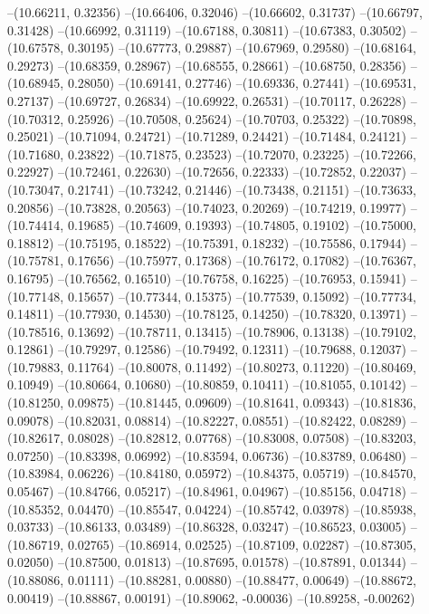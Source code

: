--(10.66211, 0.32356)
--(10.66406, 0.32046)
--(10.66602, 0.31737)
--(10.66797, 0.31428)
--(10.66992, 0.31119)
--(10.67188, 0.30811)
--(10.67383, 0.30502)
--(10.67578, 0.30195)
--(10.67773, 0.29887)
--(10.67969, 0.29580)
--(10.68164, 0.29273)
--(10.68359, 0.28967)
--(10.68555, 0.28661)
--(10.68750, 0.28356)
--(10.68945, 0.28050)
--(10.69141, 0.27746)
--(10.69336, 0.27441)
--(10.69531, 0.27137)
--(10.69727, 0.26834)
--(10.69922, 0.26531)
--(10.70117, 0.26228)
--(10.70312, 0.25926)
--(10.70508, 0.25624)
--(10.70703, 0.25322)
--(10.70898, 0.25021)
--(10.71094, 0.24721)
--(10.71289, 0.24421)
--(10.71484, 0.24121)
--(10.71680, 0.23822)
--(10.71875, 0.23523)
--(10.72070, 0.23225)
--(10.72266, 0.22927)
--(10.72461, 0.22630)
--(10.72656, 0.22333)
--(10.72852, 0.22037)
--(10.73047, 0.21741)
--(10.73242, 0.21446)
--(10.73438, 0.21151)
--(10.73633, 0.20856)
--(10.73828, 0.20563)
--(10.74023, 0.20269)
--(10.74219, 0.19977)
--(10.74414, 0.19685)
--(10.74609, 0.19393)
--(10.74805, 0.19102)
--(10.75000, 0.18812)
--(10.75195, 0.18522)
--(10.75391, 0.18232)
--(10.75586, 0.17944)
--(10.75781, 0.17656)
--(10.75977, 0.17368)
--(10.76172, 0.17082)
--(10.76367, 0.16795)
--(10.76562, 0.16510)
--(10.76758, 0.16225)
--(10.76953, 0.15941)
--(10.77148, 0.15657)
--(10.77344, 0.15375)
--(10.77539, 0.15092)
--(10.77734, 0.14811)
--(10.77930, 0.14530)
--(10.78125, 0.14250)
--(10.78320, 0.13971)
--(10.78516, 0.13692)
--(10.78711, 0.13415)
--(10.78906, 0.13138)
--(10.79102, 0.12861)
--(10.79297, 0.12586)
--(10.79492, 0.12311)
--(10.79688, 0.12037)
--(10.79883, 0.11764)
--(10.80078, 0.11492)
--(10.80273, 0.11220)
--(10.80469, 0.10949)
--(10.80664, 0.10680)
--(10.80859, 0.10411)
--(10.81055, 0.10142)
--(10.81250, 0.09875)
--(10.81445, 0.09609)
--(10.81641, 0.09343)
--(10.81836, 0.09078)
--(10.82031, 0.08814)
--(10.82227, 0.08551)
--(10.82422, 0.08289)
--(10.82617, 0.08028)
--(10.82812, 0.07768)
--(10.83008, 0.07508)
--(10.83203, 0.07250)
--(10.83398, 0.06992)
--(10.83594, 0.06736)
--(10.83789, 0.06480)
--(10.83984, 0.06226)
--(10.84180, 0.05972)
--(10.84375, 0.05719)
--(10.84570, 0.05467)
--(10.84766, 0.05217)
--(10.84961, 0.04967)
--(10.85156, 0.04718)
--(10.85352, 0.04470)
--(10.85547, 0.04224)
--(10.85742, 0.03978)
--(10.85938, 0.03733)
--(10.86133, 0.03489)
--(10.86328, 0.03247)
--(10.86523, 0.03005)
--(10.86719, 0.02765)
--(10.86914, 0.02525)
--(10.87109, 0.02287)
--(10.87305, 0.02050)
--(10.87500, 0.01813)
--(10.87695, 0.01578)
--(10.87891, 0.01344)
--(10.88086, 0.01111)
--(10.88281, 0.00880)
--(10.88477, 0.00649)
--(10.88672, 0.00419)
--(10.88867, 0.00191)
--(10.89062, -0.00036)
--(10.89258, -0.00262)
